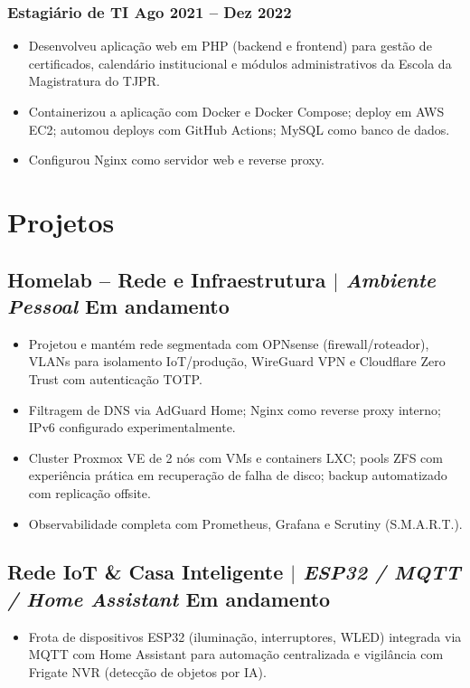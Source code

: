 \documentclass[10.5pt]{article}
\begin{document}
\subsubsection{Estagi\'{a}rio de TI \hfill Ago 2021 -- Dez 2022}
\begin{itemize}
    \item Desenvolveu aplica\c{c}\~{a}o web em PHP (backend e frontend) para gest\~{a}o de certificados,
          calend\'{a}rio institucional e m\'{o}dulos administrativos da Escola da Magistratura do TJPR.
    \item Containerizou a aplica\c{c}\~{a}o com Docker e Docker Compose; deploy em AWS EC2;
          automou deploys com GitHub Actions; MySQL como banco de dados.
    \item Configurou Nginx como servidor web e reverse proxy.
\end{itemize}

\section{Projetos}
\subsection{Homelab -- Rede e Infraestrutura $|$ \normalfont\textit{Ambiente Pessoal} \hfill Em andamento}
\begin{itemize}
    \item Projetou e mant\'{e}m rede segmentada com OPNsense (firewall/roteador), VLANs para isolamento
          IoT/produ\c{c}\~{a}o, WireGuard VPN e Cloudflare Zero Trust com autentica\c{c}\~{a}o TOTP.
    \item Filtragem de DNS via AdGuard Home; Nginx como reverse proxy interno; IPv6 configurado experimentalmente.
    \item Cluster Proxmox VE de 2 n\'{o}s com VMs e containers LXC; pools ZFS com experi\^{e}ncia pr\'{a}tica
          em recupera\c{c}\~{a}o de falha de disco; backup automatizado com replica\c{c}\~{a}o offsite.
    \item Observabilidade completa com Prometheus, Grafana e Scrutiny (S.M.A.R.T.).
\end{itemize}
\subsection{Rede IoT \& Casa Inteligente $|$ \normalfont\textit{ESP32 / MQTT / Home Assistant} \hfill Em andamento}
\begin{itemize}
    \item Frota de dispositivos ESP32 (ilumina\c{c}\~{a}o, interruptores, WLED) integrada via MQTT com
          Home Assistant para automa\c{c}\~{a}o centralizada e vigil\^{a}ncia com Frigate NVR (detec\c{c}\~{a}o
          de objetos por IA).
\end{itemize}
\end{document}

